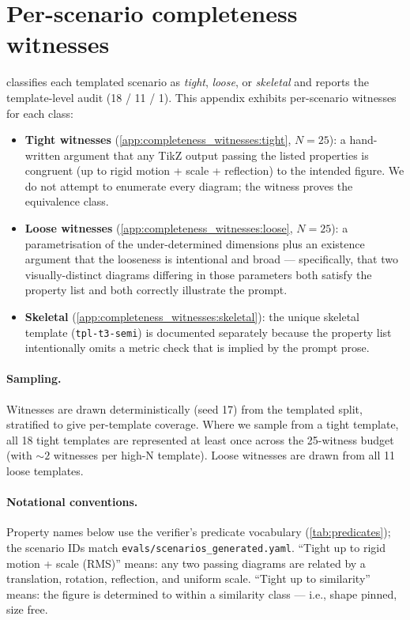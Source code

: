\section{Per-scenario completeness witnesses}
\label{app:completeness_witnesses}

 classifies each templated scenario as \emph{tight}, \emph{loose}, or \emph{skeletal} and reports the template-level audit (18 / 11 / 1). This appendix exhibits per-scenario witnesses for each class:

\begin{itemize}
\item \textbf{Tight witnesses} (\cref{app:completeness_witnesses:tight}, $N{=}25$): a hand-written argument that any TikZ output passing the listed properties is congruent (up to rigid motion + scale + reflection) to the intended figure. We do not attempt to enumerate every diagram; the witness proves the equivalence class.
\item \textbf{Loose witnesses} (\cref{app:completeness_witnesses:loose}, $N{=}25$): a parametrisation of the under-determined dimensions plus an existence argument that the looseness is intentional and broad --- specifically, that two visually-distinct diagrams differing in those parameters both satisfy the property list and both correctly illustrate the prompt.
\item \textbf{Skeletal} (\cref{app:completeness_witnesses:skeletal}): the unique skeletal template (\texttt{tpl-t3-semi}) is documented separately because the property list intentionally omits a metric check that is implied by the prompt prose.
\end{itemize}

\paragraph{Sampling.}
Witnesses are drawn deterministically (seed 17) from the templated split, stratified to give per-template coverage. Where we sample from a tight template, all 18 tight templates are represented at least once across the 25-witness budget (with $\sim 2$ witnesses per high-N template). Loose witnesses are drawn from all 11 loose templates.

\paragraph{Notational conventions.}
Property names below use the verifier's predicate vocabulary (\cref{tab:predicates}); the scenario IDs match \texttt{evals/scenarios\_generated.yaml}.
``Tight up to rigid motion + scale (RMS)'' means: any two passing diagrams are related by a translation, rotation, reflection, and uniform scale.
``Tight up to similarity'' means: the figure is determined to within a similarity class --- i.e., shape pinned, size free.

